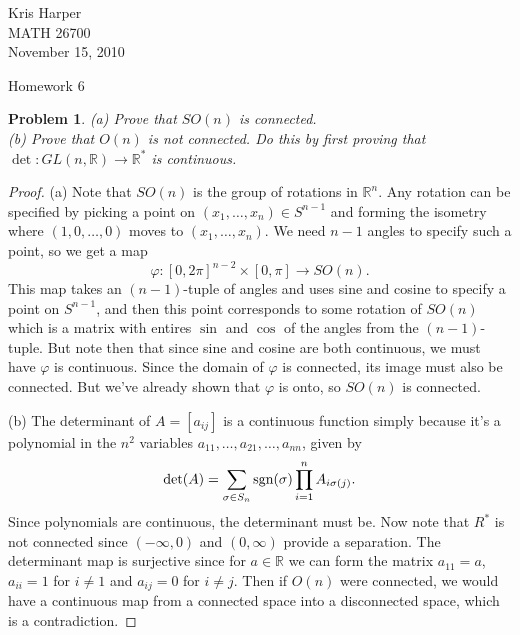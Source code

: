 \documentclass{article}
\newcommand{\sgn}{\textup{sgn}}
\newtheorem{problem}{Problem}
\begin{document}
\begin{flushright}
Kris Harper\\

MATH 26700\\

November 15, 2010
\end{flushright}

\begin{center}
Homework 6
\end{center}

\begin{problem}
(a) Prove that $SO(n)$ is connected.\\
(b) Prove that $O(n)$ is not connected. Do this by first proving that $\det : GL(n, \mathbb{R}) \to \mathbb{R}^*$ is continuous.
\end{problem}
\begin{proof}
(a) Note that $SO(n)$ is the group of rotations in $\mathbb{R}^n$. Any rotation can be specified by picking a point on $(x_1, \dots , x_n) \in S^{n-1}$ and forming the isometry where $(1,0, \dots , 0)$ moves to $(x_1, \dots , x_n)$. We need $n-1$ angles to specify such a point, so we get a map
\[
\varphi : [0, 2 \pi]^{n-2} \times [0, \pi] \to SO(n).
\]
This map takes an $(n-1)$-tuple of angles and uses sine and cosine to specify a point on $S^{n-1}$, and then this point corresponds to some rotation of $SO(n)$ which is a matrix with entires $\sin$ and $\cos$ of the angles from the $(n-1)$-tuple. But note then that since sine and cosine are both continuous, we must have $\varphi$ is continuous. Since the domain of $\varphi$ is connected, its image must also be connected. But we've already shown that $\varphi$ is onto, so $SO(n)$ is connected.

(b) The determinant of $A = [a_{ij}]$ is a continuous function simply because it's a polynomial in the $n^2$ variables $a_{11}, \dots , a_{21}, \dots , a_{nn}$, given by
\[
\det(A) = \sum_{\sigma \in S_n} \sgn(\sigma) \prod_{i=1}^n A_{i\sigma(j)}.
\]
Since polynomials are continuous, the determinant must be. Now note that $R^*$ is not connected since $(-\infty,0)$ and $(0,\infty)$ provide a separation. The determinant map is surjective since for $a \in \mathbb{R}$ we can form the matrix $a_{11} = a$, $a_{ii} = 1$ for $i \neq 1$ and $a_{ij} = 0$ for $i \neq j$. Then if $O(n)$ were connected, we would have a continuous map from a connected space into a disconnected space, which is a contradiction.
\end{proof}
\end{document}
